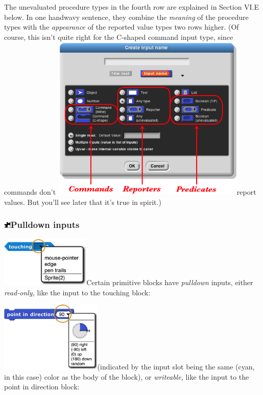 The unevaluated procedure types in the fourth row are explained in
Section VI.E below. In one handwavy sentence, they combine the
\emph{meaning} of the procedure types with the \emph{appearance} of the
reported value types two rows higher. (Of course, this isn't quite right
for the C-shaped command input type, since commands don't
\includegraphics[width=3.64583in,height=3.11389in]{media/image660.png}report
values. But you'll see later that it's true in spirit.)

\subsubsection[Pulldown
inputs]{\texorpdfstring{\protect\includegraphics[width=0.13194in,height=0.13194in]{media/image658.png}Pulldown
inputs}{Macintosh HD:Users:bh:Desktop:gear-part.pngPulldown inputs}}\label{macintosh-hdusersbhdesktopgear-part.pngpulldown-inputs}

\includegraphics[width=1.68056in,height=0.94097in]{media/image661.png}Certain
primitive blocks have \emph{pulldown} inputs, either \emph{read-only,}
like the input to the touching block:

\includegraphics[width=1.90208in,height=1.32292in]{media/image662.png}(indicated
by the input slot being the same (cyan, in this case) color as the body
of the block), or \emph{writeable,} like the input to the point in
direction block:

